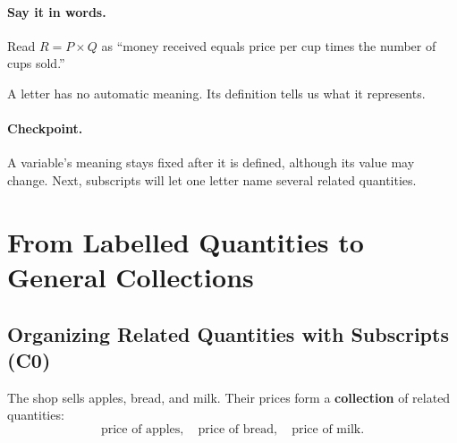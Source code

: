 	\paragraph{Say it in words.}
	Read $R=P\times Q$ as
	``money received equals price per cup times the number of cups sold.''
	
	A letter has no automatic meaning. Its definition tells us what it represents.
	
	\paragraph{Checkpoint.}
	A variable's meaning stays fixed after it is defined, although its value may change. Next, subscripts will let one letter name several related quantities.
	
	
	\section{From Labelled Quantities to General Collections}
	\label{sec:labelled-to-general}
	
	
	\subsection{Organizing Related Quantities with Subscripts (C0)}
	\label{sec:subscripts-c0}
	
	The shop sells apples, bread, and milk. Their prices form a \textbf{collection} of related quantities:
	\[
	\text{price of apples},\quad
	\text{price of bread},\quad
	\text{price of milk}.
	\]
	
